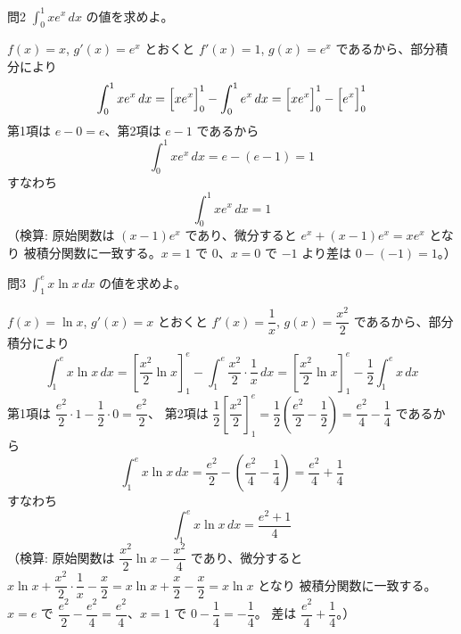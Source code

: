 \documentclass[a4paper,11pt]{article}
\begin{document}
\clearpage
\begin{mondaiboxS}{問2}
$\displaystyle\int_{0}^{1} x e^{x}\,dx$ の値を求めよ。
\end{mondaiboxS}
\kaitou
$f(x) = x$, $g'(x) = e^{x}$ とおくと $f'(x) = 1$, $g(x) = e^{x}$ であるから、部分積分により
\[
\int_{0}^{1} x e^{x}\,dx
= \Bigl[x e^{x}\Bigr]_{0}^{1} - \int_{0}^{1} e^{x}\,dx
= \Bigl[x e^{x}\Bigr]_{0}^{1} - \Bigl[e^{x}\Bigr]_{0}^{1}
\]
第1項は $e - 0 = e$、第2項は $e - 1$ であるから
\[
\int_{0}^{1} x e^{x}\,dx = e - (e-1) = 1
\]
すなわち
\[
\boxed{\; \int_{0}^{1} x e^{x}\,dx = 1 \;}
\]
（検算: 原始関数は $(x-1)e^{x}$ であり、微分すると $e^{x} + (x-1)e^{x} = x e^{x}$ となり
被積分関数に一致する。$x=1$ で $0$、$x=0$ で $-1$ より差は $0-(-1)=1$。）

\clearpage
\begin{mondaiboxS}{問3}
$\displaystyle\int_{1}^{e} x\ln x\,dx$ の値を求めよ。
\end{mondaiboxS}
\kaitou
$f(x) = \ln x$, $g'(x) = x$ とおくと $f'(x) = \dfrac{1}{x}$, $g(x) = \dfrac{x^{2}}{2}$ であるから、部分積分により
\[
\int_{1}^{e} x\ln x\,dx
= \left[\frac{x^{2}}{2}\ln x\right]_{1}^{e} - \int_{1}^{e} \frac{x^{2}}{2}\cdot\frac{1}{x}\,dx
= \left[\frac{x^{2}}{2}\ln x\right]_{1}^{e} - \frac{1}{2}\int_{1}^{e} x\,dx
\]
第1項は $\dfrac{e^{2}}{2}\cdot 1 - \dfrac{1}{2}\cdot 0 = \dfrac{e^{2}}{2}$、
第2項は $\dfrac{1}{2}\left[\dfrac{x^{2}}{2}\right]_{1}^{e} = \dfrac{1}{2}\left(\dfrac{e^{2}}{2} - \dfrac{1}{2}\right) = \dfrac{e^{2}}{4} - \dfrac{1}{4}$
であるから
\[
\int_{1}^{e} x\ln x\,dx = \frac{e^{2}}{2} - \left(\frac{e^{2}}{4} - \frac{1}{4}\right) = \frac{e^{2}}{4} + \frac{1}{4}
\]
すなわち
\[
\boxed{\; \int_{1}^{e} x\ln x\,dx = \frac{e^{2}+1}{4} \;}
\]
（検算: 原始関数は $\dfrac{x^{2}}{2}\ln x - \dfrac{x^{2}}{4}$ であり、微分すると
$x\ln x + \dfrac{x^{2}}{2}\cdot\dfrac{1}{x} - \dfrac{x}{2} = x\ln x + \dfrac{x}{2} - \dfrac{x}{2} = x\ln x$ となり
被積分関数に一致する。$x=e$ で $\dfrac{e^2}{2}-\dfrac{e^2}{4}=\dfrac{e^2}{4}$、$x=1$ で $0-\dfrac14=-\dfrac14$。
差は $\dfrac{e^2}{4}+\dfrac14$。）
\end{document}
